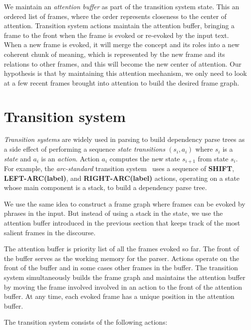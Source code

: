 \documentclass[11pt,a4paper]{article}
\begin{document}
We maintain an \emph{attention buffer} as part of the transition system state.
This an ordered list of frames, where the order represents closeness to the
center of attention. Transition system actions maintain the attention buffer, bringing
a frame to the front when the frame is evoked or re-evoked by the input text.
When a new frame is evoked, it will merge the concept and its roles into a new
coherent chunk of meaning, which is represented by the new frame and its
relations to other frames, and this will become the new center of attention.
Our hypothesis is that by maintaining this attention mechanism, we only need to
look at a few recent frames brought into attention to build the desired
frame graph.

\section{Transition system}
\label{sec:ts}

\emph{Transition systems} are widely
used in parsing to build dependency parse trees as a side effect of performing a sequence \emph{state transitions}
$(s_i,a_i)$ where $s_i$ is a \emph{state} and $a_i$ is an \emph{action}. Action $a_i$ computes the new state 
$s_{i+1}$ from state $s_i$. For example, the \emph{arc-standard}
transition system~\cite{nivre2006} uses a sequence of {\bf SHIFT}, {\bf LEFT-ARC(label)}, and
{\bf RIGHT-ARC(label)} actions, operating on a state whose main component is a stack, to build a dependency parse tree.

We use the same idea to construct a frame graph where frames can be
evoked by phrases in the input. But instead of using a stack in the state, we use the  attention
buffer introduced in the previous section that keeps track of the most salient
frames in the discourse.

The attention buffer is priority list of all the
frames evoked so far. The front of the buffer serves as the working
memory for the parser. Actions operate on the front of the buffer and in some cases other frames in the buffer. The transition
system simultaneously builds the frame graph and maintains the attention buffer
by moving the frame involved involved in an action to the front of the attention
buffer. At any time, each evoked frame has a unique position in the attention
buffer.

The transition system consists of the following actions:
\end{document}
